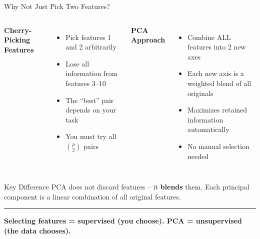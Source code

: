 \documentclass[8pt,aspectratio=169]{beamer}
\newcommand{\bottomnote}[1]{%
\vfill
\vspace{-2mm}
\textcolor{mllavender2}{\rule{\textwidth}{0.4pt}}
\vspace{1mm}
\footnotesize
\textbf{#1}
}
\newenvironment{compactlist}{%
  \begin{itemize}%
    \setlength{\itemsep}{2pt}%
    \setlength{\parskip}{0pt}%
    \setlength{\parsep}{0pt}%
}{%
  \end{itemize}%
}
\newcommand{\highlight}[1]{\textcolor{mlorange}{\textbf{#1}}}
\begin{document}
\begin{frame}[t]{Why Not Just Pick Two Features?}
\begin{columns}[T]
\small
\textbf{\textcolor{mlred}{Cherry-Picking Features}}
\begin{compactlist}
\item Pick features 1 and 2 arbitrarily
\item Lose all information from features 3--10
\item The ``best'' pair depends on your task
\item You must try all $\binom{p}{2}$ pairs
\end{compactlist}

\small
\textbf{\textcolor{mlgreen}{PCA Approach}}
\begin{compactlist}
\item Combine ALL features into 2 new axes
\item Each new axis is a weighted blend of all originals
\item Maximizes retained information automatically
\item No manual selection needed
\end{compactlist}
\end{columns}

\vspace{3mm}
\begin{block}{Key Difference}
\small PCA does not discard features -- it \highlight{blends} them. Each principal component is a linear combination of all original features.
\end{block}

\bottomnote{Selecting features = supervised (you choose). PCA = unsupervised (the data chooses).}
\end{frame}
\end{document}
